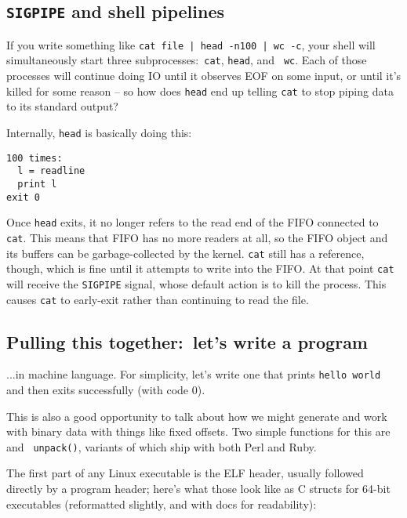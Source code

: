 \subsection{{\tt SIGPIPE} and shell pipelines}
If you write something like \verb/cat file | head -n100 | wc -c/, your shell
will simultaneously start three subprocesses:~{\tt cat}, {\tt head}, and {\tt
wc}. Each of those processes will continue doing IO until it observes EOF on
some input, or until it's killed for some reason -- so how does {\tt head} end
up telling {\tt cat} to stop piping data to its standard output?

Internally, {\tt head} is basically doing this:

\begin{verbatim}
100 times:
  l = readline
  print l
exit 0
\end{verbatim}

Once {\tt head} exits, it no longer refers to the read end of the FIFO connected
to {\tt cat}. This means that FIFO has no more readers at all, so the FIFO
object and its buffers can be garbage-collected by the kernel. {\tt cat} still
has a reference, though, which is fine until it attempts to write into the FIFO.
At that point {\tt cat} will receive the {\tt SIGPIPE} signal, whose default
action is to kill the process. This causes {\tt cat} to early-exit rather than
continuing to read the file.

\subsection{Pulling this together:~let's write a program}
...in machine language. For simplicity, let's write one that prints {\tt hello
world} and then exits successfully (with code 0).

This is also a good opportunity to talk about how we might generate and work
with binary data with things like fixed offsets. Two simple functions for this
are  and {\tt
unpack()}, variants of which ship with both Perl and Ruby.

The first part of any Linux executable is the ELF header, usually followed
directly by a program header; here's what those look like as C structs for
64-bit executables (reformatted slightly, and with docs for readability):

